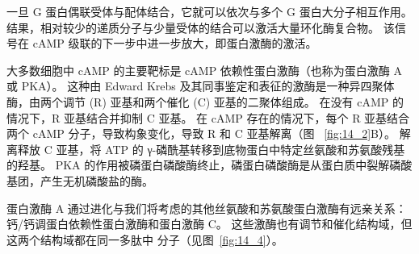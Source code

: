 一旦 G 蛋白偶联受体与配体结合，它就可以依次与多个 G 蛋白大分子相互作用。
结果，相对较少的递质分子与少量受体的结合可以激活大量环化酶复合物。
该信号在 cAMP 级联的下一步中进一步放大，即蛋白激酶的激活。


大多数细胞中 cAMP 的主要靶标是 cAMP 依赖性蛋白激酶（也称为蛋白激酶 A 或 PKA）。
这种由 Edward Krebs 及其同事鉴定和表征的激酶是一种异四聚体酶，由两个调节 (R) 亚基和两个催化 (C) 亚基的二聚体组成。
在没有 cAMP 的情况下，R 亚基结合并抑制 C 亚基。 在 cAMP 存在的情况下，每个 R 亚基结合两个 cAMP 分子，导致构象变化，导致 R 和 C 亚基解离（图 ~\ref{fig:14_2}B）。
解离释放 C 亚基，将 ATP 的 γ-磷酰基转移到底物蛋白中特定丝氨酸和苏氨酸残基的羟基。
PKA 的作用被磷蛋白磷酸酶终止，磷蛋白磷酸酶是从蛋白质中裂解磷酸基团，产生无机磷酸盐的酶。


蛋白激酶 A 通过进化与我们将考虑的其他丝氨酸和苏氨酸蛋白激酶有远亲关系：钙/钙调蛋白依赖性蛋白激酶和蛋白激酶 C。
这些激酶也有调节和催化结构域，但这两个结构域都在同一多肽中 分子（见图~\ref{fig:14_4}）。


